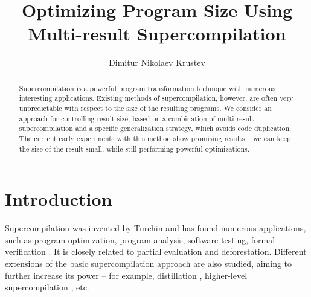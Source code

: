 \documentclass[submission,copyright,creativecommons]{eptcs}
\title{Optimizing Program Size Using Multi-result Supercompilation}
\author{Dimitur Nikolaev Krustev
\institute{IGE+XAO Balkan\\ Sofia, Bulgaria}
\email{\quad \EmailAddress{dkrustev}{ige-xao.com}}
}
\begin{document}
\maketitle

\begin{abstract}
Supercompilation is a powerful program transformation technique with numerous interesting applications.
Existing methods of supercompilation, however, are often very unpredictable with respect to the size
of the resulting programs.
We consider an approach for controlling result size, based on a combination of multi-result
supercompilation and a specific generalization strategy, which avoids code duplication.
The current early experiments with this method show promising results -- we can keep
the size of the result small, while still performing powerful optimizations.
\end{abstract}

\section{Introduction}

Supercompilation was invented by Turchin \cite{TurchinSupercompilerConcept} and has found numerous
applications, such as program optimization\cite{Sorensen1994TurchinSupercompiler,sorm98b,TMR/SCP2014}, 
program analysis, software testing, formal verification \cite{Klyuchnikov2010,Lisitsa2017,MendelGleasonPhD2011}.
It is closely related to partial evaluation \cite{Jones:1993:PEA:153676} and deforestation.
Different extensions of the basic supercompilation approach are also studied, aiming to further increase
its power -- for example, distillation \cite{10.1145/1244381.1244391}, higher-level supercompilation \cite{Klyuchnikov:META2010:HigherLevelScp}, etc.
\end{document}
